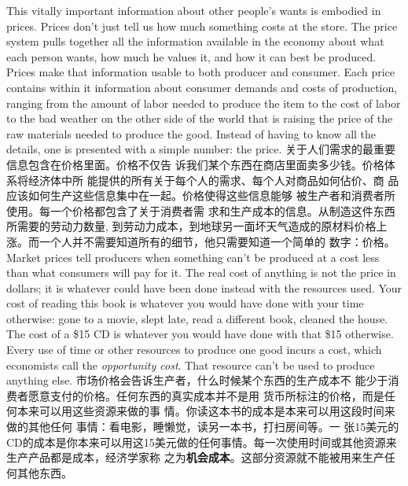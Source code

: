 \begin{paracol}{2}
This vitally important information about other people's wants
is embodied in prices. Prices don't just tell us how much something costs at the store. The price system pulls together all the
information available in the economy about what each person
wants, how much he values it, and how it can best be produced.
Prices make that information usable to both producer and consumer. Each price contains within it information about consumer demands and costs of production, ranging from the
amount of labor needed to produce the item to the cost of labor
to the bad weather on the other side of the world that is raising
the price of the raw materials needed to produce the good. Instead of having to know all the details, one is presented with a
simple number: the price.
\switchcolumn
关于人们需求的最重要信息包含在价格里面。价格不仅告
诉我们某个东西在商店里面卖多少钱。价格体系将经济体中所
能提供的所有关于每个人的需求、每个人对商品如何佔价、商
品应该如何生产这些信息集中在一起。价格使得这些信息能够
被生产者和消费者所使用。每一个价格都包含了关于消费者需
求和生产成本的信息。从制造这件东西所需要的劳动力数量,
到劳动力成本，到地球另一面坏天气造成的原材料价格上涨。而一个人并不需要知道所有的细节，他只需要知道一个简单的
数字：价格。
\switchcolumn*
Market prices tell producers when something can't be produced at a cost less than what consumers will pay for it. The
real cost of anything is not the price in dollars; it is whatever
could have been done instead with the resources used. Your cost
of reading this book is whatever you would have done with your
time otherwise: gone to a movie, slept late, read a different
book, cleaned the house. The cost of a \$15 CD is whatever you
would have done with that \$15 otherwise. Every use of time or
other resources to produce one good incurs a cost, which economists call the\textit{ opportunity cost}. That resource can't be used to produce anything else.
\switchcolumn
市场价格会告诉生产者，什么时候某个东西的生产成本不
能少于消费者愿意支付的价格。任何东西的真实成本并不是用
货币所标注的价格，而是任何本来可以用这些资源来做的事
情。你读这本书的成本是本来可以用这段时间来做的其他任何
事情：看电影，睡懒觉，读另一本书，打扫房间等。一 张15美元的CD的成本是你本来可以用这15美元做的任何事情。每一次使用时间或其他资源来生产产品都是成本，经济学家称
之为\textbf{机会成本}。这部分资源就不能被用来生产任何其他东西。
\switchcolumn*

\end{paracol}
